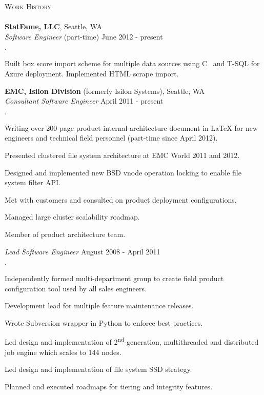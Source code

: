 \documentclass[11pt]{article}
\newcommand{\lineunder}{\vspace*{-8pt} \\ \hspace*{-18pt} \hrulefill \\}
\newcommand{\header}[1]{{\hspace*{-15pt}\vspace*{6pt} \textsc{#1}} \vspace*{-6pt} \lineunder}
\newenvironment{achievements}{\begin{list}{\bf \Large $\cdot$}{\topsep 2pt \itemsep 0pt}}{\vspace*{4pt}\end{list}}
\DeclareRobustCommand{\csharplogo}{\hbox{C\hspace{-0.5ex}
    \protect\raisebox{0.5ex}
    {\protect\scalebox{0.67}{\#}}}}
\begin{document}
\smallskip

\header{Work History}

{\bf StatFame, LLC}, Seattle, WA \\
{\em Software Engineer} (part-time) \hfill June 2012 - present
\begin{achievements}
\item Built box score import scheme for multiple data sources using
  \csharplogo{} and T-SQL for Azure deployment.  Implemented HTML scrape import.
\end{achievements}

{\bf EMC, Isilon Division} (formerly Isilon Systems), Seattle, WA \\
  {\em Consultant Software Engineer} \hfill April 2011 - present
  \begin{achievements}
  \item Writing over 200-page product internal architecture document in
    \LaTeX{} for new engineers and technical field personnel (part-time since
    April 2012).
  \item Presented clustered file system architecture at EMC World 2011 and 2012.
  \item Designed and implemented new BSD vnode operation locking to enable
    file system filter API.
  \item Met with customers and consulted on product deployment configurations.
  \item Managed large cluster scalability roadmap.
  \item Member of product architecture team.
  \end{achievements}

  {\em Lead Software Engineer} \hfill August 2008 - April 2011
  \begin{achievements}
  \item Independently formed multi-department group to create field product
    configuration tool used by all sales engineers.
  \item Development lead for multiple feature maintenance releases.
  \item Wrote Subversion wrapper in Python to enforce best practices.
  \item Led design and implementation of 2\textsuperscript{nd}-generation, multithreaded
    and distributed job engine which scales to 144 nodes.
  \item Led design and implementation of file system SSD strategy.
  \item Planned and executed roadmaps for tiering and integrity features.
  \end{achievements}
\end{document}
